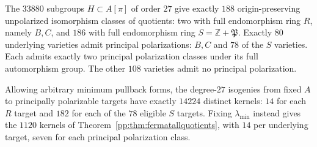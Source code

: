 \begin{theorem}
\label{pp:thm:fermatunderlying}
The $33880$ subgroups $H\subset A[\pi]$ of order $27$ give exactly
$188$ origin-preserving unpolarized isomorphism classes of quotients:
two with full endomorphism ring $R$, namely $B,C$, and $186$ with
full endomorphism ring $S=\mathbb Z+\mathfrak P$.
Exactly $80$ underlying varieties admit principal polarizations: $B,C$
and $78$ of the $S$ varieties. Each admits exactly two principal
polarization classes under its full automorphism group. The other
$108$ varieties admit no principal polarization.

Allowing arbitrary minimum pullback forms, the degree-$27$ isogenies
from fixed $A$ to principally polarizable targets have exactly $14224$
distinct kernels: $14$ for each $R$ target and $182$ for each of the
$78$ eligible $S$ targets. Fixing $\lambda_{\min}$ instead gives the
$1120$ kernels of Theorem~\ref{pp:thm:fermatallquotients}, with $14$
per underlying target, seven for each principal polarization class.
\end{theorem}
